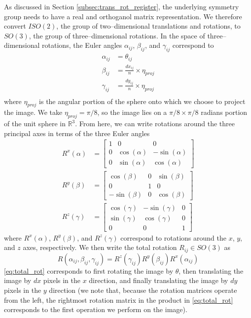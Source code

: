 \documentclass{pnastwo}
\begin{document}
\begin{article}
\begin{materials}
As discussed in Section \ref{subsec:trans_rot_register}, the underlying symmetry group needs to have a real and orthoganol matrix representation. 
%
We therefore convert $ISO(2)$, the group of two--dimensional translations and rotations, to $SO(3)$, the group of three--dimensional rotations. 
%
In the space of three--dimensional rotations, the Euler angles $\alpha_{ij}$, $\beta_{ij}$, and $\gamma_{ij}$ correspond to
\begin{equation} \label{eq:angle_relations}
\begin{aligned}
	\alpha_{ij} &= \theta_{ij} \\
	\beta_{ij} &= \frac{dx_{ij}}{n} \times \eta_{proj} \\
	\gamma_{ij} &= \frac{dy_{ij}}{n} \times \eta_{proj} \\
\end{aligned}
\end{equation}
where $\eta_{proj}$ is the angular portion of the sphere onto which we choose to project the image.
%
We take $\eta_{proj} =  \pi/8$, so the image lies on a $\pi/8 \times \pi/8$ radians portion of the unit sphere in $\mathbb{R}^3$.
%
From here, we can write rotations around the three principal axes in terms of the three Euler angles
\begin{equation}
\begin{aligned}
	R^x(\alpha) &= \begin{bmatrix}
	1 & 0 & 0 \\
    0 & \cos(\alpha) & -\sin(\alpha) \\
    0 & \sin(\alpha) & \cos(\alpha)
	\end{bmatrix} \\
	R^y(\beta) &= \begin{bmatrix}
	\cos(\beta) & 0 & \sin(\beta) \\
    0 & 1 & 0 \\
    -\sin(\beta) & 0 & \cos(\beta)
    \end{bmatrix} \\
	R^z(\gamma) &= \begin{bmatrix} 
	\cos(\gamma) & -\sin(\gamma) & 0 \\
    \sin(\gamma) & \cos(\gamma) & 0 \\
    0 & 0 & 1 
    \end{bmatrix}
\end{aligned}
\end{equation}
where $R^x(\alpha)$, $R^y(\beta)$, and $R^z(\gamma)$ correspond to rotations around the $x$, $y$, and $z$ axes, respectively.
%
We then write the total rotation $R_{ij} \in SO(3)$ as 
\begin{equation} \label{eq:total_rot}
	R(\alpha_{ij}, \beta_{ij}, \gamma_{ij})	 = R^z(\gamma_{ij})  R^y(\beta_{ij})  R^x(\alpha_{ij})
\end{equation}
%
\eqref{eq:total_rot} corresponds to first rotating the image by $\theta$, then translating the image by $dx$ pixels in the $x$ direction, and finally translating the image by $dy$ pixels in the $y$ direction (we note that, because the rotation matrices operate from the left, the rightmost rotation matrix in the product in \eqref{eq:total_rot} corresponds to the first operation we perform on the image).


\end{materials}
\end{article}
\end{document}
